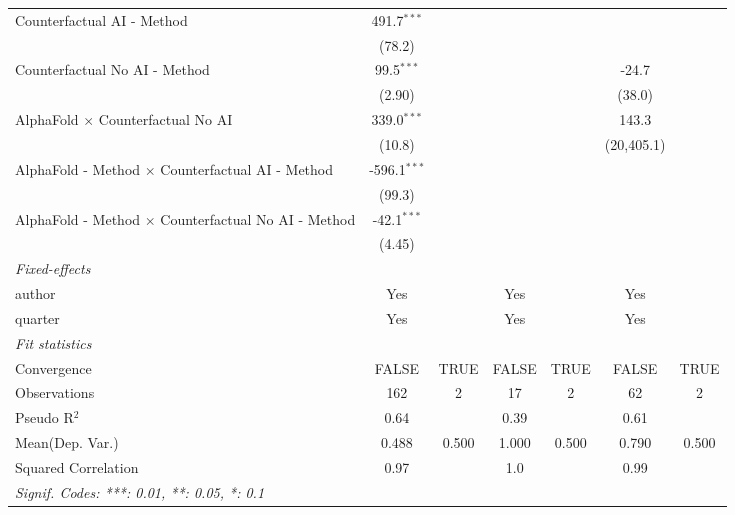 \begin{tabular}{lcccccc}
   Counterfactual AI - Method                                 & 491.7$^{***}$  &      &         &      &            &   \\   
                                                              & (78.2)         &      &         &      &            &   \\   
   Counterfactual No AI - Method                              & 99.5$^{***}$   &      &         &      & -24.7      &   \\   
                                                              & (2.90)         &      &         &      & (38.0)     &   \\   
   AlphaFold $\times$ Counterfactual No AI                    & 339.0$^{***}$  &      &         &      & 143.3      &   \\   
                                                              & (10.8)         &      &         &      & (20,405.1) &   \\   
   AlphaFold - Method $\times$ Counterfactual AI - Method     & -596.1$^{***}$ &      &         &      &            &   \\   
                                                              & (99.3)         &      &         &      &            &   \\   
   AlphaFold - Method $\times$ Counterfactual No AI - Method  & -42.1$^{***}$  &      &         &      &            &   \\   
                                                              & (4.45)         &      &         &      &            &   \\   
   \midrule
   \emph{Fixed-effects}\\
   author                                                     & Yes            &      & Yes     &      & Yes        & \\  
   quarter                                                    & Yes            &      & Yes     &      & Yes        & \\  
   \midrule
   \emph{Fit statistics}\\
   Convergence                                                &FALSE           & TRUE & FALSE   & TRUE & FALSE      & TRUE\\  
   Observations                                               & 162            & 2    & 17      & 2    & 62         & 2\\  
   Pseudo R$^2$                                               & 0.64           &      & 0.39    &      & 0.61       & \\  
Mean(Dep. Var.) & 0.488 & 0.500 & 1.000 & 0.500 & 0.790 & 0.500 \\
   Squared Correlation                                        & 0.97           &      & 1.0     &      & 0.99       & \\  
   \midrule \midrule
   \multicolumn{7}{l}{\emph{Signif. Codes: ***: 0.01, **: 0.05, *: 0.1}}\\
\end{tabular}
\par\endgroup
